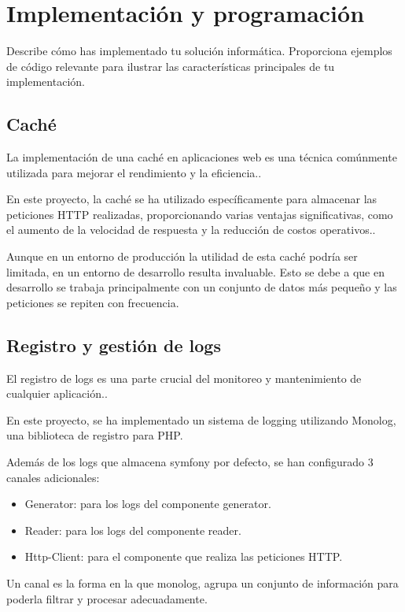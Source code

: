 \section{Implementación y programación}\label{sec:implemetacion_y_programacion}

Describe cómo has implementado tu solución informática.
Proporciona ejemplos de código relevante para ilustrar las características principales de tu implementación.

\subsection*{Caché}
La implementación de una caché en aplicaciones web es una técnica comúnmente utilizada para mejorar el rendimiento y la
eficiencia..

En este proyecto, la caché se ha utilizado específicamente para almacenar las peticiones HTTP realizadas, proporcionando
varias ventajas significativas, como el aumento de la velocidad de respuesta y la reducción de costos operativos..

Aunque en un entorno de producción la utilidad de esta caché podría ser limitada, en un entorno de desarrollo resulta
invaluable. Esto se debe a que en desarrollo se trabaja principalmente con un conjunto de datos más pequeño y las
peticiones se repiten con frecuencia.

\subsection*{Registro y gestión de logs}
El registro de logs es una parte crucial del monitoreo y mantenimiento de cualquier aplicación..

En este proyecto, se ha implementado un sistema de logging utilizando Monolog, una biblioteca de registro para PHP.

Además de los logs que almacena symfony por defecto, se han configurado 3 canales adicionales:

\begin{itemize}
    \item Generator: para los logs del componente generator.
    \item Reader: para los logs del componente reader.
    \item Http-Client: para el componente que realiza las peticiones HTTP.
\end{itemize}

Un canal es la forma en la que monolog, agrupa un conjunto de información para poderla filtrar y procesar adecuadamente.

